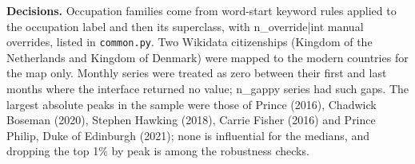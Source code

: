 \documentclass[11pt,a4paper]{article}
\begin{document}
\textbf{Decisions.} Occupation families come from word-start keyword rules applied to the occupation label and then its superclass, with {{n_override|int}} manual overrides, listed in \texttt{common.py}. Two Wikidata citizenships (Kingdom of the Netherlands and Kingdom of Denmark) were mapped to the modern countries for the map only. Monthly series were treated as zero between their first and last months where the interface returned no value; {{n_gappy}} series had such gaps. The largest absolute peaks in the sample were those of Prince (2016), Chadwick Boseman (2020), Stephen Hawking (2018), Carrie Fisher (2016) and Prince Philip, Duke of Edinburgh (2021); none is influential for the medians, and dropping the top 1\% by peak is among the robustness checks.
\end{document}
